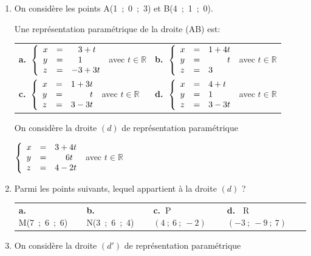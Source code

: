 \documentclass[10pt]{article}
\providecommand{\R}{\mathbb{R}}
\begin{document}
\begin{enumerate}
\item On considère les points A(1~;~0~;~3) et B(4~;~1~;~0).

Une représentation paramétrique de la droite (AB) est:

\begin{center}
\begin{tabularx}{\linewidth}{*{2}{X}}
\textbf{a.~}$\left\{\begin{array}{l c l}
x &=& \phantom{-}3 + t \\
y &=& \phantom{-}1\\
z &=& - 3 +3t
\end{array}\right.$ avec $t \in \R$&\textbf{b.~}$\left\{\begin{array}{l c l}
x &=& 1+4t\\
y &=&\phantom{1 + 4}t\\
z &=& 3\end{array}\right.$ avec $t \in \R$\\
\textbf{c.~}$\left\{\begin{array}{l c l}
x &=& 1 + 3t\\
y &=&\phantom{1 + 3}t\\
z&=&3 - 3t
\end{array}\right.$ avec $t \in \R$&\textbf{d.~}$\left\{\begin{array}{l c l}
x&=&4 + t\\
y&=&1\\
z&=&3 - 3t
\end{array}\right.$ avec $t \in \R$
\end{tabularx}
\end{center}

On considère la droite $(d)$ de représentation paramétrique 

$\left\{\begin{array}{l c l}
x&=&3 + 4t\\
y&=&\phantom{3 + }6t\\
z&=&4 - 2t
\end{array}\right.$ avec $t \in \R$

\item Parmi les points suivants, lequel appartient à la droite $(d)$ ?
\begin{center}
\begin{tabularx}{\linewidth}{*{4}{X}}
\textbf{a.~} M(7~;~6~;~6) &\textbf{b.~} N(3~;~6~;~4) &\textbf{c.~}P$(4~;~6~;~-2)$&\textbf{d.~} R$(-3~;~-9~;~7)$
\end{tabularx}
\end{center}
\item On considère la droite $(d')$ de représentation paramétrique 


\end{enumerate}
\end{document}
